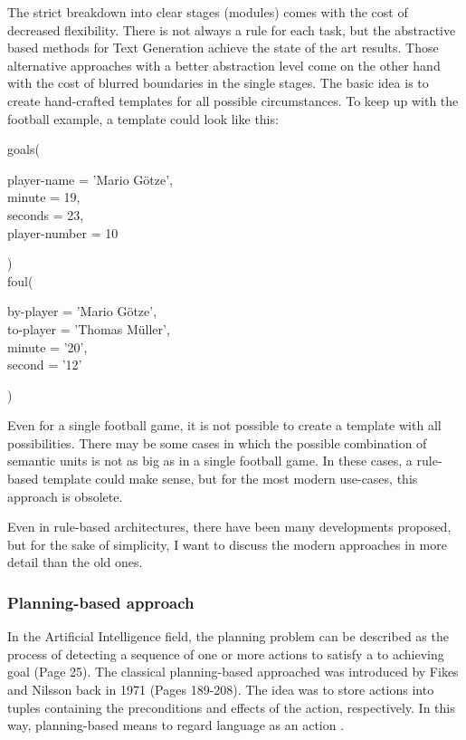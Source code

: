 The strict breakdown into clear stages (modules) comes with the cost of decreased flexibility. There is not always a rule for each task, but the abstractive based methods for Text Generation achieve the state of the art results. Those alternative approaches with a better abstraction level come on the other hand with the cost of blurred boundaries in the single stages. The basic idea is to create hand-crafted templates for all possible circumstances. To keep up with the football example, a template could look like this:

\begin{tcolorbox}
	goals(
	\begin{addmargin}[1cm]{1cm}
		player-name = 'Mario Götze',\\
		minute = 19,\\
		seconds = 23,\\
		player-number = 10
	\end{addmargin}
	
	)\\
	
	foul(
	\begin{addmargin}[1cm]{1cm}
		by-player = 'Mario Götze',\\
		to-player = 'Thomas Müller',\\
		minute = '20',\\
		second = '12'
	\end{addmargin}
	)
\end{tcolorbox}

Even for a single football game, it is not possible to create a template with all possibilities. There may be some cases in which the possible combination of semantic units is not as big as in a single football game. In these cases, a rule-based template could make sense, but for the most modern use-cases, this approach is obsolete.

Even in rule-based architectures, there have been many developments proposed, but for the sake of simplicity, I want to discuss the modern approaches in more detail than the old ones.

\subsubsection{Planning-based approach}

In the Artificial Intelligence field, the planning problem can be described as the process of detecting a sequence of one or more actions to satisfy a to achieving goal \cite{gatt} (Page 25). The classical planning-based approached was introduced by Fikes and Nilsson back in 1971 \cite{Fikes:71} (Pages 189-208). The idea was to store actions into tuples containing the preconditions and effects of the action, respectively. In this way, planning-based means to regard language as an action \cite{clark}. 

